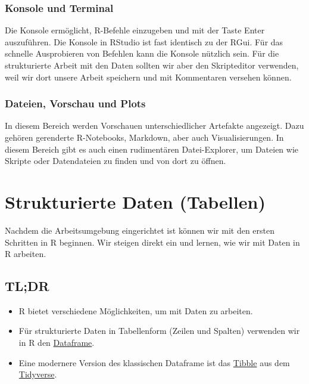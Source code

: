 \documentclass[
]{book}
\providecommand{\tightlist}{%
  \setlength{\itemsep}{0pt}\setlength{\parskip}{0pt}}
\begin{document}
\hypertarget{konsole-und-terminal}{%
\subsection{Konsole und Terminal}\label{konsole-und-terminal}}

Die Konsole ermöglicht, R-Befehle einzugeben und mit der Taste Enter auszuführen. Die Konsole in RStudio ist fast identisch zu der RGui. Für das schnelle Ausprobieren von Befehlen kann die Konsole nützlich sein. Für die strukturierte Arbeit mit den Daten sollten wir aber den Skripteditor verwenden, weil wir dort unsere Arbeit speichern und mit Kommentaren versehen können.

\hypertarget{dateien-vorschau-und-plots}{%
\subsection{Dateien, Vorschau und Plots}\label{dateien-vorschau-und-plots}}

In diesem Bereich werden Vorschauen unterschiedlicher Artefakte angezeigt. Dazu gehören gerenderte R-Notebooks, Markdown, aber auch Visualisierungen. In diesem Bereich gibt es auch einen rudimentären Datei-Explorer, um Dateien wie Skripte oder Datendateien zu finden und von dort zu öffnen.

\hypertarget{strukturierte-daten-tabellen}{%
\chapter{Strukturierte Daten (Tabellen)}\label{strukturierte-daten-tabellen}}

Nachdem die Arbeitsumgebung eingerichtet ist können wir mit den ersten Schritten in R beginnen. Wir steigen direkt ein und lernen, wie wir mit Daten in R arbeiten.

\hypertarget{tldr-1}{%
\section*{TL;DR}\label{tldr-1}}

\begin{itemize}
\tightlist
\item
  R bietet verschiedene Möglichkeiten, um mit Daten zu arbeiten.
\item
  Für strukturierte Daten in Tabellenform (Zeilen und Spalten) verwenden wir in R den \protect\hyperlink{der-dataframe}{Dataframe}.
\item
  Eine modernere Version des klassischen Dataframe ist das \protect\hyperlink{tibbles}{Tibble} aus dem \protect\hyperlink{das-tidyverse}{Tidyverse}.
\end{itemize}
\end{document}
